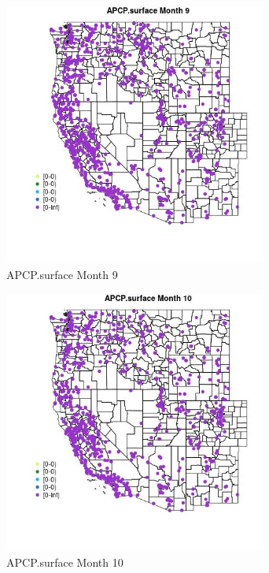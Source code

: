 \begin{figure} 
\centering  
\includegraphics[width=0.77\textwidth]{Code_Outputs/Report_ML_input_PM25_Step4_part_f_de_duplicated_aveswNAs_MapObsMo9APCPsurface.jpg} 
\caption{\label{fig:Report_ML_input_PM25_Step4_part_f_de_duplicated_aveswNAsMapObsMo9APCPsurface}APCP.surface Month 9} 
\end{figure} 
 

\begin{figure} 
\centering  
\includegraphics[width=0.77\textwidth]{Code_Outputs/Report_ML_input_PM25_Step4_part_f_de_duplicated_aveswNAs_MapObsMo10APCPsurface.jpg} 
\caption{\label{fig:Report_ML_input_PM25_Step4_part_f_de_duplicated_aveswNAsMapObsMo10APCPsurface}APCP.surface Month 10} 
\end{figure} 
 

